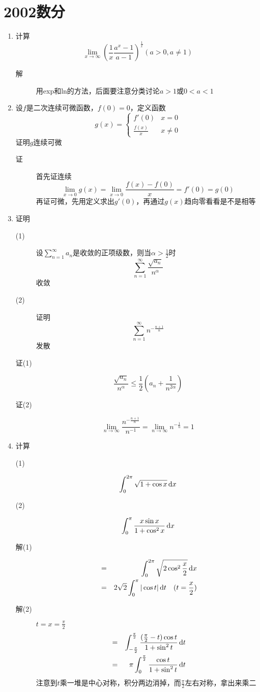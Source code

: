 \section{2002数分}
\begin{enumerate}
\item 计算
\[
\lim_{x\to \infty}\left(\frac{1}{x}\frac{a^x-1}{a-1}\right)^{\frac{1}{x}} (a>0,a\neq 1)
\]
\begin{description}
\item[解] 用exp和ln的方法，后面要注意分类讨论$a>1$或$0<a<1$
\end{description}

\item 设$f$是二次连续可微函数，$f(0)=0$，定义函数
\[
g(x) = \begin{cases}
f'(0) & x=0 \\
\frac{f(x)}{x} & x\neq 0
\end{cases}
\]
证明$g$连续可微
\begin{description}
\item[证] 首先证连续
\[
\lim_{x\to 0}g(x)=\lim_{x\to 0}\frac{f(x)-f(0)}{x}=f'(0)=g(0)
\]
再证可微，先用定义求出$g'(0)$，再通过$g(x)$趋向零看看是不是相等
\end{description}

\item 证明
\begin{description}
\item[(1)] 设$\sum_{n=1}^{\infty} a_n$是收敛的正项级数，则当$\alpha>\frac{1}{2}$时
\[
\sum_{n=1}^{\infty} \frac{\sqrt{a_n}}{n^{\alpha}}
\]
收敛
\item[(2)] 证明
\[
\sum_{n=1}^{\infty}n^{-\frac{n+1}{n}}
\]
发散
\item[证(1)]
\[
\frac{\sqrt{a_n}}{n^{\alpha}}\leq\frac{1}{2}\left(a_n+\frac{1}{n^{2\alpha}}\right)
\]
\item[证(2)]
\[
\lim_{n\to\infty}\frac{n^{-\frac{n+1}{n}}}{n^{-1}}=\lim_{n\to \infty}n^{-\frac{1}{n}}=1
\]
\end{description}

\item 计算
\begin{description}
\item[(1)]
\[
\int_0^{2\pi} \sqrt{1+\cos x}\,\mathrm{d} x
\]
\item[(2)]
\[
\int_0^{\pi}\frac{x\sin x}{1+\cos^2x}\,\mathrm{d} x
\]
\item[解(1)]
\begin{eqnarray*}
&=& \int_0^{2\pi} \sqrt{2\cos^2\frac{x}{2}}\,\mathrm{d} x\\
&=& 2\sqrt{2}\int_0^{\pi} |\cos t|\,\mathrm{d} t\quad(t=\frac{x}{2})
\end{eqnarray*}
\item[解(2)] $t=x=\frac{\pi}{2}$
\begin{eqnarray*}
&=& \int_{-\frac{\pi}{2}}^\frac{\pi}{2}\frac{(\frac{\pi}{2}-t)\cos t}{1+\sin^2t}\,\mathrm{d} t\\
&=&\pi \int_0^\frac{\pi}{2}\frac{\cos t}{1+\sin^2t}\,\mathrm{d} t
\end{eqnarray*}
注意到$t$乘一堆是中心对称，积分两边消掉，而$\frac{\pi}{2}$左右对称，拿出来乘二
\end{description}


\end{enumerate}
